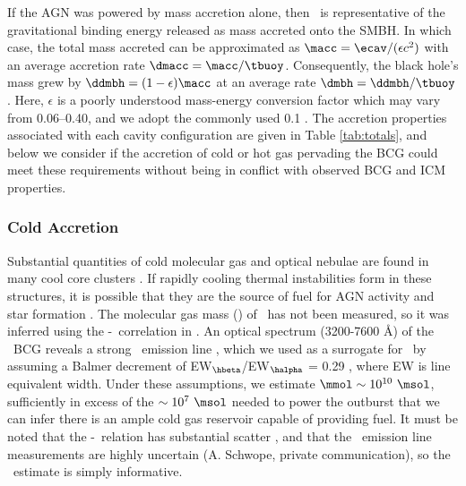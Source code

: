 \documentclass[11pt, preprint]{aastex}
\begin{document}
If the AGN was powered by mass accretion alone, then \ecav\ is
representative of the gravitational binding energy released as mass
accreted onto the SMBH. In which case, the total mass accreted can be
approximated as $\macc = \ecav/(\epsilon c^2)$ with an average
accretion rate $\dmacc = \macc/\tbuoy$. Consequently, the black hole's
mass grew by $\ddmbh = (1-\epsilon)\macc$ at an average rate $\dmbh =
\ddmbh/\tbuoy$. Here, $\epsilon$ is a poorly understood mass-energy
conversion factor which may vary from 0.06--0.40, and we adopt the
commonly used 0.1 \citep{2002apa..book.....F}. The accretion
properties associated with each cavity configuration are given in
Table \ref{tab:totals}, and below we consider if the accretion of cold
or hot gas pervading the BCG could meet these requirements without
being in conflict with observed BCG and ICM properties.

\subsubsection{Cold Accretion}
\label{sec:cold}

Substantial quantities of cold molecular gas and optical nebulae are
found in many cool core clusters \citep{crawford99, edge01}. If
rapidly cooling thermal instabilities form in these structures, it is
possible that they are the source of fuel for AGN activity and star
formation \citep[\eg][]{pizzolato05, 2006NewA...12...38S,
  2010MNRAS.408..961P}. The molecular gas mass (\mmol) of \rbs\ has
not been measured, so it was inferred using the
\mmol-\halpha\ correlation in \citet{edge01}. An optical spectrum
(3200-7600 \AA) of the \rbs\ BCG reveals a strong \hbeta\ emission
line \citep{rbs1, rbs2}, which we used as a surrogate for \halpha\ by
assuming a Balmer decrement of EW$_{\hbeta}$/EW$_{\halpha}$ = 0.29
\citep{2006ApJ...642..775M}, where EW is line equivalent width. Under
these assumptions, we estimate $\mmol \sim 10^{10} ~\msol$,
sufficiently in excess of the $\sim 10^7 ~\msol$ needed to power the
outburst that we can infer there is an ample cold gas reservoir
capable of providing fuel. It must be noted that the
\mmol-\halpha\ relation has substantial scatter \citep{salome03}, and
that the \rbs\ emission line measurements are highly uncertain
(A. Schwope, private communication), so the \mmol\ estimate is simply
informative.
\end{document}
